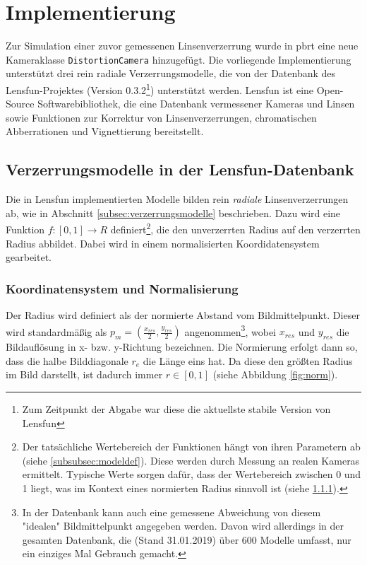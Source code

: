 \section{Implementierung}

Zur Simulation einer zuvor gemessenen Linsenverzerrung wurde in pbrt eine neue Kameraklasse \texttt{DistortionCamera} hinzugefügt. Die vorliegende Implementierung unterstützt drei rein radiale Verzerrungsmodelle, die von der Datenbank des Lensfun-Projektes\cite{lensfun_basic} (Version 0.3.2\footnote{Zum Zeitpunkt der Abgabe war diese die aktuellste stabile Version von Lensfun}) unterstützt werden. Lensfun ist eine Open-Source Softwarebibliothek, die eine Datenbank vermessener Kameras und Linsen sowie Funktionen zur Korrektur von Linsenverzerrungen, chromatischen Abberrationen und Vignettierung bereitstellt.

\subsection{Verzerrungsmodelle in der Lensfun-Datenbank}

Die in Lensfun implementierten Modelle bilden rein \emph{radiale} Linsenverzerrungen ab, wie in Abschnitt \ref{subsec:verzerrungsmodelle} beschrieben. Dazu wird eine Funktion $f:[0,1] \rightarrow R$ definiert\footnote{Der tatsächliche Wertebereich der Funktionen hängt von ihren Parametern ab (siehe \ref{subsubsec:modeldef}). Diese werden durch Messung an realen Kameras ermittelt. Typische Werte sorgen dafür, dass der Wertebereich zwischen 0 und 1 liegt, was im Kontext eines normierten Radius sinnvoll ist (siehe \ref{subsubsec:norm_radius}).}, die den unverzerrten Radius auf den verzerrten Radius abbildet. Dabei wird in einem normalisierten Koordidatensystem gearbeitet.

\subsubsection{Koordinatensystem und Normalisierung}
\label{subsubsec:norm_radius}

Der Radius wird definiert als der normierte Abstand vom Bildmittelpunkt. Dieser wird standardmäßig als $p_m = (\frac{x_{res}}{2}, \frac{y_{res}}{2})$ angenommen\footnote{In der Datenbank kann auch eine gemessene Abweichung von diesem "idealen" Bildmittelpunkt angegeben werden. Davon wird allerdings in der gesamten Datenbank, die (Stand 31.01.2019) über 600 Modelle umfasst, nur ein einziges Mal Gebrauch gemacht.}, wobei $x_{res}$ und $y_{res}$ die Bildauflösung in x- bzw. y-Richtung bezeichnen. Die Normierung erfolgt dann so, dass die halbe Bilddiagonale $r_e$ die Länge eins hat. Da diese den größten Radius im Bild darstellt, ist dadurch immer $r \in [0,1]$ (siehe Abbildung \ref{fig:norm}). 

